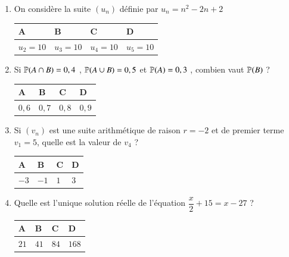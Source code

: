 \documentclass[oneside,12pt]{exam}          %
\begin{document}
\begin{enumerate}[label=\underline{Question \no\arabic*} :  , leftmargin=* , itemsep=5mm]
	\item On considère la suite $(u_n)$ définie par $u_n = n^2 - 2n + 2$
	
		\hspace{\linewidth-\textwidth}
		\renewcommand{\arraystretch}{1.5}
		\begin{tabular}{| P{0.22\textwidth} | P{0.22\textwidth} | P{0.22\textwidth} | P{0.22\textwidth} |} \hline
			A & B & C & D \\ \hline
			$u_2 = 10$ & $u_3 = 10$ & $u_4 = 10$ & $u_5=10$ \\ \hline
		\end{tabular}



	\item Si ${\mathbb P}(A \cap B) = 0,4$ , ${\mathbb P}(A \cup B) = 0,5$ et ${\mathbb P}(A) = 0,3$ , combien vaut ${\mathbb P}(B)$ ?
	
		\hspace{\linewidth-\textwidth}
		\renewcommand{\arraystretch}{1.5}
		\begin{tabular}{| P{0.22\textwidth} | P{0.22\textwidth} | P{0.22\textwidth} | P{0.22\textwidth} |} \hline
			A & B & C & D \\ \hline
			$0,6$ & $0,7$ & $0,8$ & $0,9$ \\ \hline
		\end{tabular}
		
		

	\item Si $(v_n)$ est une suite arithmétique de raison $r = -2$ et de premier terme $v_1 = 5$, quelle est la valeur de  $v_4$ ?
	
		\hspace{\linewidth-\textwidth}
		\renewcommand{\arraystretch}{1.5}
		\begin{tabular}{| P{0.22\textwidth} | P{0.22\textwidth} | P{0.22\textwidth} | P{0.22\textwidth} |} \hline
			A & B & C & D \\ \hline
			$-3$ & $-1$ & $1$ & $3$ \\ \hline
		\end{tabular}
		
		

	\item Quelle est l'unique solution réelle de l'équation $\dfrac{x}{2} + 15 = x - 27$ ?
	
		\hspace{\linewidth-\textwidth}
		\renewcommand{\arraystretch}{1.5}
		\begin{tabular}{| P{0.22\textwidth} | P{0.22\textwidth} | P{0.22\textwidth} | P{0.22\textwidth} |} \hline
			A & B & C & D \\ \hline
			$21$ & $41$ & $84$ & $168$ \\ \hline
		\end{tabular}
		

\end{enumerate}
\end{document}
